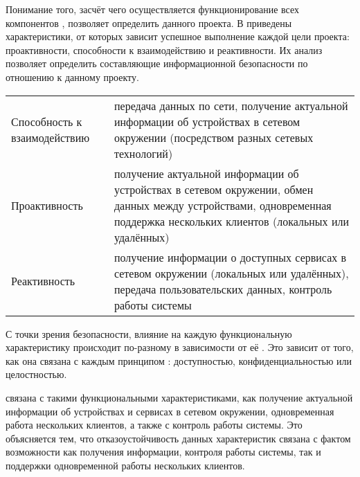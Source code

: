 %
Понимание того, засчёт чего осуществляется функционирование всех компонентов , позволяет определить  данного проекта. 
%
В  приведены характеристики, от которых зависит успешное выполнение каждой цели проекта: проактивности, способности к взаимодействию и реактивности. 
%
Их анализ позволяет определить составляющие информационной безопасности по отношению к данному проекту. 

 {
	\begin{tabular}{ | p{6cm} | p{8cm} | }
	  \hline                       
	  \Bold{Цель} & \Bold{Характеристики} \\ \hline
	  Способность к взаимодействию & передача данных по сети, \linebreak получение актуальной информации об устройствах в сетевом окружении (посредством разных сетевых технологий) \\ \hline
	  Проактивность & получение актуальной информации об устройствах в сетевом окружении, \linebreak обмен данных между устройствами, \linebreak одновременная поддержка нескольких клиентов (локальных или удалённых) \\ \hline
	  Реактивность & получение информации о доступных сервисах в сетевом окружении (локальных или удалённых), \linebreak передача пользовательских данных, \linebreak контроль работы системы \\ \hline
	\end{tabular}
}

%
С точки зрения безопасности, влияние на каждую функциональную характеристику происходит по-разному в зависимости от её . 
%
Это зависит от того, как она связана с каждым принципом : доступностью, конфиденциальностью или целостностью. 

%
 связана с такими функциональными характеристиками, как получение актуальной информации об устройствах и сервисах в сетевом окружении, одновременная работа нескольких клиентов, а также с контроль работы системы. 
%
Это объясняется тем, что отказоустойчивость данных характеристик связана с фактом возможности как получения информации, контроля работы системы, так и поддержки одновременной работы нескольких клиентов. 

